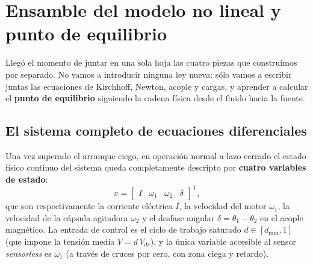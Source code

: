 \documentclass[11pt,a4paper,oneside]{book}
\begin{document}
\chapter{Ensamble del modelo no lineal y punto de equilibrio}\label{cap:ensamble}

\begin{ideafisica}
Llegó el momento de juntar en una sola hoja las cuatro piezas que construimos
por separado. No vamos a introducir ninguna ley nueva: sólo vamos a escribir
juntas las ecuaciones de Kirchhoff, Newton, acople y cargas, y aprender a
calcular el \textbf{punto de equilibrio} siguiendo la cadena física desde el
fluido hacia la fuente.
\end{ideafisica}

\section{El sistema completo de ecuaciones diferenciales}

Una vez superado el arranque ciego, en operación normal a lazo cerrado el estado
físico continuo del sistema queda completamente descripto por \textbf{cuatro
variables de estado}:
\[
  x = \begin{bmatrix} I & \omega_1 & \omega_2 & \delta \end{bmatrix}^{\mathsf{T}},
\]
que son respectivamente la corriente eléctrica $I$, la velocidad del motor
$\omega_1$, la velocidad de la cápsula agitadora $\omega_2$ y el desfase angular
$\delta = \theta_1 - \theta_2$ en el acople magnético. La entrada de control es
el ciclo de trabajo saturado $d \in [d_{\min}, 1]$ (que impone la tensión media
$V = d\,V_{dc}$), y la única variable accesible al sensor \emph{sensorless} es
$\omega_1$ (a través de cruces por cero, con zona ciega y retardo).
\end{document}
